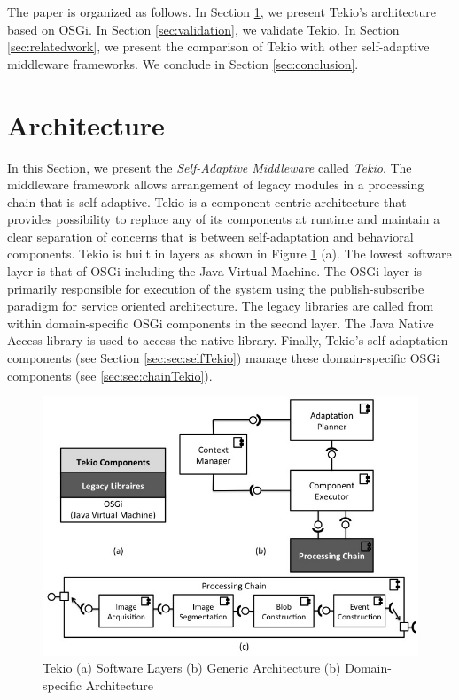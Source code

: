 \documentclass{acm_proc_article-sp}
\begin{document}
The paper is organized as follows.  In Section \ref{sec:architecture}, we present Tekio's architecture based on OSGi. In Section \ref{sec:validation}, we validate Tekio. In Section \ref{sec:relatedwork}, we present the comparison of Tekio with other self-adaptive middleware frameworks. We conclude in Section \ref{sec:conclusion}.



\section{Architecture}
\label{sec:architecture}

In this Section, we present the \emph{Self-Adaptive Middleware} called \emph{Tekio}.  The middleware framework allows arrangement of legacy modules in a processing chain that is self-adaptive. Tekio is a component centric architecture  that provides possibility to replace any of its components at runtime and maintain a clear separation of concerns that is between self-adaptation and behavioral components. Tekio is built in layers as shown in Figure \ref{fig:tekioArch} (a). The lowest software layer is that of OSGi including the Java Virtual Machine. The OSGi layer is primarily responsible for execution of the system using the publish-subscribe paradigm for service oriented architecture. The legacy libraries are called from within domain-specific OSGi components in the second layer. The Java Native Access library is used to access the native library. Finally, Tekio's self-adaptation components (see Section \ref{sec:sec:selfTekio}) manage these domain-specific OSGi components (see \ref{sec:sec:chainTekio}). 



\begin{figure}
	\includegraphics[scale=0.3]{images/architecture.jpg}
	 \caption{Tekio (a) Software Layers (b) Generic Architecture (b) Domain-specific Architecture}
	 \label{fig:tekioArch} 
\end{figure}
\end{document}
